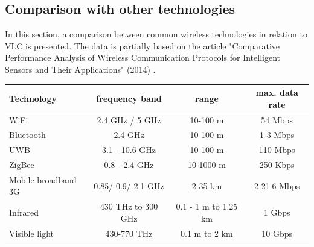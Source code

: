 \subsection{Comparison with other technologies}
In this section, a comparison between common wireless technologies in relation to VLC is presented.
The data is partially based on the article "Comparative Performance Analysis of Wireless
Communication Protocols for Intelligent Sensors
and Their Applications" (2014) \cite{comparison}.\\
\newline
  \begin{tabular}{l| c c c }
    Technology & frequency band & range & max. data rate \\
    \hline
   WiFi & 2.4 GHz / 5 GHz & 10-100 m &  54 Mbps\\
   Bluetooth & 2.4 GHz & 10-100 m & 1-3 Mbps \\
   UWB & 3.1 - 10.6 GHz & 10-100 m & 110 Mbps\\
   ZigBee & 0.8 - 2.4 GHz & 10-1000 m &  250 Kbps\\
   Mobile broadband 3G & 0.85/ 0.9/ 2.1 GHz & 2-35 km &  2-21.6 Mbps \\
   Infrared & 430 THz to 300 GHz & 0.1 - 1 m to 1.25 km & 1 Gbps \\
   Visible light & 430-770 THz & 0.1 m to 2 km & 10 Gbps \\
  \end{tabular}











